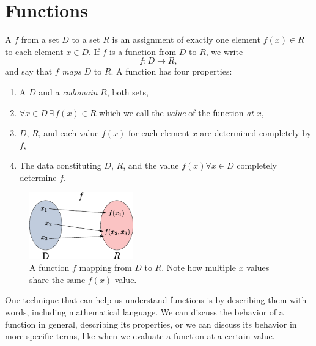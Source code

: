 \chapter{Functions}

\begin{defn}[function]
    A  $f$
    from a set $D$ to a set $R$
    is an assignment of exactly one element
    $f(x) \in R$ to each element $x \in D$.
    If $f$ is a function from $D$ to $R$, we write
    \begin{equation}
        f:D \to R,
        \label{eq:function_definition}
    \end{equation}
    and say that $f$ \emph{maps} $D$ to $R$.
    A function has four properties:
    \begin{enumerate}
        \item A  $D$ and a \emph{codomain} $R$, both sets,
        \item $\forall x \in D\, \exists\, f(x) \in R$
          which we call the
          \emph{value} of the function \emph{at} $x$,
        \item $D$, $R$, and each value $f(x)$ for each element $x$ are
              determined completely by $f$,
        \item The data constituting $D$, $R$, and the value 
              $f(x) \forall x \in D$
              completely determine $f$.
    \end{enumerate}
\begin{figure}
  \centering
  \includegraphics[width=0.4\textwidth]{continuous/functions/function.eps}
  \caption{A function $f$ mapping from $D$ to $R$.
    Note how multiple $x$ values share the same $f(x)$ value.}
  \label{fig:function}
\end{figure}

\end{defn}

One technique that can help us understand functions is by describing them with words,
including mathematical language.
We can discuss the behavior of a function in general,
describing its properties, or we can discuss its behavior in more specific terms,
like when we evaluate a function at a certain value.

